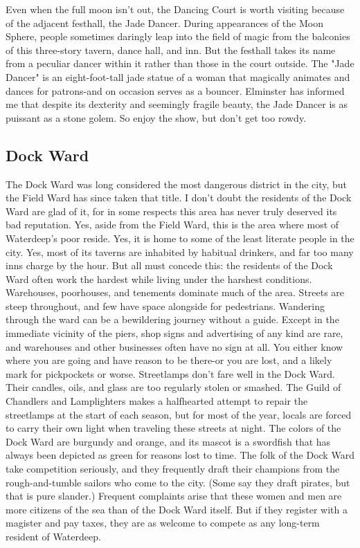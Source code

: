 \documentclass[10pt,a4paper,twoside,twocolumn,openany,nodeprecatedcode]{dndbook}
\begin{document}
Even when the full moon isn't out, the Dancing Court is worth visiting because of the adjacent festhall, the Jade Dancer. During appearances of the Moon Sphere, people sometimes daringly leap into the field of magic from the balconies of this three-story tavern, dance hall, and inn. But the festhall takes its name from a peculiar dancer within it rather than those in the court outside. The "Jade Dancer" is an eight-foot-tall jade statue of a woman that magically animates and dances for patrons-and on occasion serves as a bouncer. Elminster has informed me that despite its dexterity and seemingly fragile beauty, the Jade Dancer is as puissant as a stone golem. So enjoy the show, but don't get too rowdy.
\subsection{Dock Ward}
The Dock Ward was long considered the most dangerous district in the city, but the Field Ward has since taken that title. I don't doubt the residents of the Dock Ward are glad of it, for in some respects this area has never truly deserved its bad reputation.
Yes, aside from the Field Ward, this is the area where most of Waterdeep's poor reside. Yes, it is home to some of the least literate people in the city. Yes, most of its taverns are inhabited by habitual drinkers, and far too many inns charge by the hour. But all must concede this: the residents of the Dock Ward often work the hardest while living under the harshest conditions.
Warehouses, poorhouses, and tenements dominate much of the area. Streets are steep throughout, and few have space alongside for pedestrians. Wandering through the ward can be a bewildering journey without a guide. Except in the immediate vicinity of the piers, shop signs and advertising of any kind are rare, and warehouses and other businesses often have no sign at all. You either know where you are going and have reason to be there-or you are lost, and a likely mark for pickpockets or worse.
Streetlamps don't fare well in the Dock Ward. Their candles, oils, and glass are too regularly stolen or smashed. The Guild of Chandlers and Lamplighters makes a halfhearted attempt to repair the streetlamps at the start of each season, but for most of the year, locals are forced to carry their own light when traveling these streets at night.
The colors of the Dock Ward are burgundy and orange, and its mascot is a swordfish that has always been depicted as green for reasons lost to time. The folk of the Dock Ward take competition seriously, and they frequently draft their champions from the rough-and-tumble sailors who come to the city. (Some say they draft pirates, but that is pure slander.) Frequent complaints arise that these women and men are more citizens of the sea than of the Dock Ward itself. But if they register with a magister and pay taxes, they are as welcome to compete as any long-term resident of Waterdeep.
\end{document}

